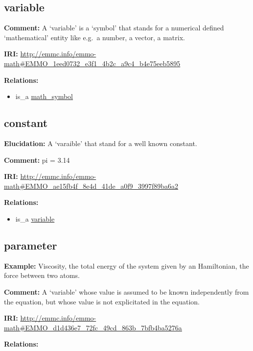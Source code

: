 \documentclass[a4paper,]{report}
\providecommand{\tightlist}{%
  \setlength{\itemsep}{0pt}\setlength{\parskip}{0pt}}
\begin{document}
\hypertarget{variable}{%
\subsection{variable}\label{variable}}

\textbf{Comment:} A `variable' is a `symbol' that stands for a numerical
defined `mathematical' entity like e.g.~a number, a vector, a matrix.

\textbf{IRI:}
\url{http://emmc.info/emmo-math\#EMMO_1eed0732_e3f1_4b2c_a9c4_b4e75eeb5895}

\textbf{Relations:}

\begin{itemize}
\tightlist
\item
  is\_a \protect\hyperlink{math_symbol}{math\_symbol}
\end{itemize}

\hypertarget{constant}{%
\subsection{constant}\label{constant}}

\textbf{Elucidation:} A `varaible' that stand for a well known constant.

\textbf{Comment:} pi = 3.14

\textbf{IRI:}
\url{http://emmc.info/emmo-math\#EMMO_ae15fb4f_8e4d_41de_a0f9_3997f89ba6a2}

\textbf{Relations:}

\begin{itemize}
\tightlist
\item
  is\_a \protect\hyperlink{variable}{variable}
\end{itemize}

\hypertarget{parameter}{%
\subsection{parameter}\label{parameter}}

\textbf{Example:} Viscosity, the total energy of the system given by an
Hamiltonian, the force between two atoms.

\textbf{Comment:} A `variable' whose value is assumed to be known
independently from the equation, but whose value is not explicitated in
the equation.

\textbf{IRI:}
\url{http://emmc.info/emmo-math\#EMMO_d1d436e7_72fc_49cd_863b_7bfb4ba5276a}

\textbf{Relations:}
\end{document}
